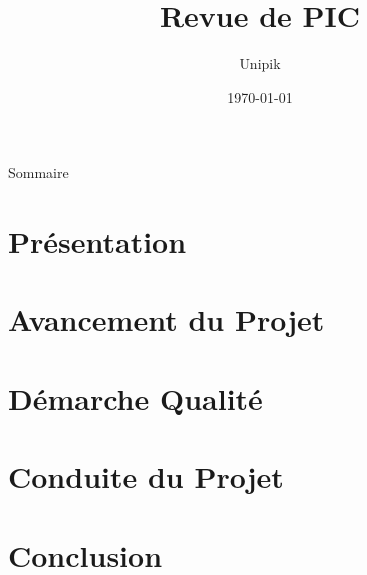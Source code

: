 \documentclass[compress,xcolor=dvipsnames]{beamer}
\title{Revue de PIC}
\date{\today}
\author{Unipik}
\institute{\insa}
\begin{document}
\speaker{\Sergi} 

\begin{frame}[plain]
	\titlepage
\end{frame}

\begin{frame}{Sommaire}
	\tableofcontents[hideallsubsections]
\end{frame}
 

\speaker{\Sergi}
\section[Présentation]{Présentation}



\section[Avancement]{Avancement du Projet}



\section[Qualité]{Démarche Qualité}


\section[Conduite du projet]{Conduite du Projet}



\section[Conclusion]{Conclusion}

\end{document}
